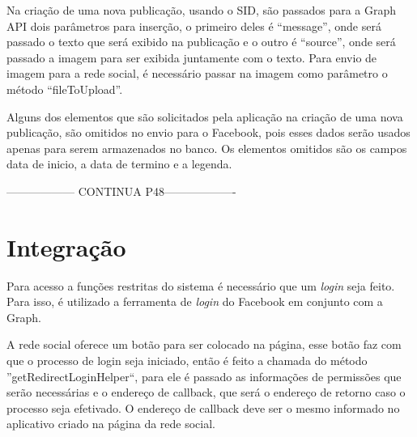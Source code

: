 Na criação de uma nova publicação, usando o SID, são passados para a Graph API dois parâmetros para inserção, o primeiro deles é “message”, onde será passado o texto que será exibido na publicação e o outro é “source”, onde será passado a imagem para ser exibida juntamente com o texto. Para envio de imagem para a rede social, é necessário passar na imagem como parâmetro o método “fileToUpload”. 

Alguns dos elementos que são solicitados pela aplicação na criação de uma nova publicação, são omitidos no envio para o Facebook, pois esses dados serão usados apenas para serem armazenados no banco. Os elementos omitidos são os campos data de inicio, a data de termino e a legenda. 

------------------ CONTINUA  P48-------------------

\section{Integração}
Para acesso a funções restritas do sistema é necessário que um \textit{login} seja feito. Para isso, é utilizado a ferramenta de \textit{login} do Facebook em conjunto com a Graph. 

A rede social oferece um botão para ser colocado na página, esse botão faz com que o processo de login seja iniciado, então é feito a chamada do método ''getRedirectLoginHelper``, para ele é passado as informações de permissões que serão necessárias e o endereço de callback, que será o endereço de retorno caso o processo seja efetivado. O endereço de callback deve ser o mesmo informado no aplicativo criado na página da rede social.

